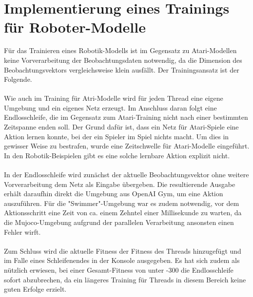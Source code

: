 \section{Implementierung eines Trainings für Roboter-Modelle}
Für das Trainieren eines Robotik-Modells ist im Gegensatz zu Atari-Modellen keine Vorverarbeitung der Beobachtungsdaten notwendig, da die Dimension des Beobachtungsvektors vergleichsweise klein ausfällt. Der Trainingsansatz ist der Folgende.
\\
\\
Wie auch im Training für Atri-Modelle wird für jeden Thread eine eigene Umgebung und ein eigenes Netz erzeugt. Im Anschluss daran folgt eine Endlosschleife, die im Gegensatz zum Atari-Training nicht nach einer bestimmten Zeitspanne enden soll. Der Grund dafür ist, dass ein Netz für Atari-Spiele eine Aktion lernen konnte, bei der ein Spieler im Spiel nichts macht. Um dies in gewisser Weise zu bestrafen, wurde eine Zeitschwelle für Atari-Modelle eingeführt. In den Robotik-Beispielen gibt es eine solche lernbare Aktion explizit nicht.
\\
\\
In der Endlosschleife wird zunächst der aktuelle Beobachtungsvektor ohne weitere Vorverarbeitung dem Netz als Eingabe übergeben. Die resultierende Ausgabe erhält daraufhin direkt die Umgebung aus OpenAI Gym, um eine Aktion auszuführen. Für die "Swimmer"-Umgebung war es zudem notwendig, vor dem Aktionsschritt eine Zeit von ca. einem Zehntel einer Millisekunde zu warten, da die Mujoco-Umgebung aufgrund der parallelen Verarbeitung ansonsten einen Fehler wirft.
\\
\\
Zum Schluss wird die aktuelle Fitness der Fitness des Threads hinzugefügt und im Falle eines Schleifenendes in der Konsole ausgegeben. Es hat sich zudem als nützlich erwiesen, bei einer Gesamt-Fitness von unter -300 die Endlosschleife sofort abzubrechen, da ein längeres Training für Threads in diesem Bereich keine guten Erfolge erzielt.